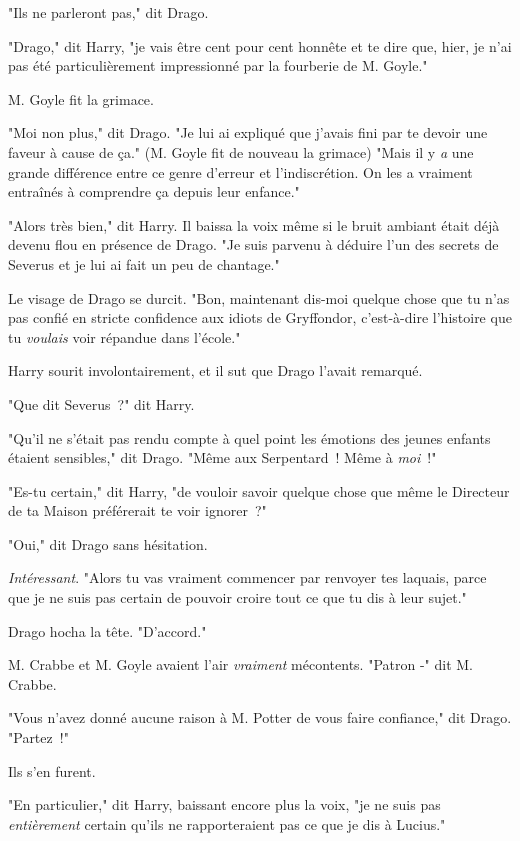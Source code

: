 "Ils ne parleront pas," dit Drago.

"Drago," dit Harry, "je vais être cent pour cent honnête et te dire que, hier, je n'ai pas été particulièrement impressionné par la fourberie de M. Goyle."

M. Goyle fit la grimace.

"Moi non plus," dit Drago. "Je lui ai expliqué que j'avais fini par te devoir une faveur à cause de ça." (M. Goyle fit de nouveau la grimace) "Mais il y \emph{a} une grande différence entre ce genre d'erreur et l'indiscrétion. On les a vraiment entraînés à comprendre ça depuis leur enfance."

"Alors très bien," dit Harry. Il baissa la voix même si le bruit ambiant était déjà devenu flou en présence de Drago. "Je suis parvenu à déduire l'un des secrets de Severus et je lui ai fait un peu de chantage."

Le visage de Drago se durcit. "Bon, maintenant dis-moi quelque chose que tu n'as pas confié en stricte confidence aux idiots de Gryffondor, c'est-à-dire l'histoire que tu \emph{voulais} voir répandue dans l'école."

Harry sourit involontairement, et il sut que Drago l'avait remarqué.

"Que dit Severus~?" dit Harry.

"Qu'il ne s'était pas rendu compte à quel point les émotions des jeunes enfants étaient sensibles," dit Drago. "Même aux Serpentard~! Même à \emph{moi}~!"

"Es-tu certain," dit Harry, "de vouloir savoir quelque chose que même le Directeur de ta Maison préférerait te voir ignorer~?"

"Oui," dit Drago sans hésitation.

\emph{Intéressant}. "Alors tu vas vraiment commencer par renvoyer tes laquais, parce que je ne suis pas certain de pouvoir croire tout ce que tu dis à leur sujet."

Drago hocha la tête. "D'accord."

M. Crabbe et M. Goyle avaient l'air \emph{vraiment} mécontents. "Patron -" dit M. Crabbe.

"Vous n'avez donné aucune raison à M. Potter de vous faire confiance," dit Drago. "Partez~!"

Ils s'en furent.

"En particulier," dit Harry, baissant encore plus la voix, "je ne suis pas \emph{entièrement} certain qu'ils ne rapporteraient pas ce que je dis à Lucius."

